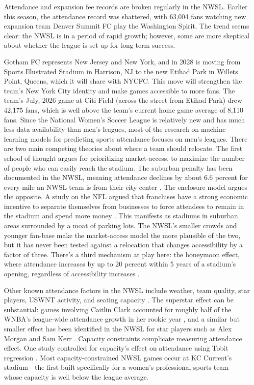 \documentclass[9pt,twoside]{pnas-new}
\begin{document}
Attendance and expansion fee records are broken regularly in the NWSL. Earlier this season, the attendance record was shattered, with 63,004 fans watching new expansion team Denver Summit FC play the Washington Spirit. The trend seems clear: the NWSL is in a period of rapid growth; however, some are more skeptical about whether the league is set up for long-term success.

Gotham FC represents New Jersey and New York, and in 2028 is moving from Sports Illustrated Stadium in Harrison, NJ to the new Etihad Park in Willets Point, Queens, which it will share with NYCFC. This move will strengthen the team's New York City identity and make games accessible to more fans. The team's July, 2026 game at Citi Field (across the street from Etihad Park) drew 42,175 fans, which is well above the team's current home game average of 8,110 fans. 
\Endparasplit Since the National Women's Soccer League is relatively new and has much less data availability than men's leagues, most of the research on machine learning models for predicting sports attendance focuses on men's leagues. There are two main competing theories about where a team should relocate. The first school of thought argues for prioritizing market-access, to maximize the number of people who can easily reach the stadium. The suburban penalty has been documented in the NWSL, meaning attendance declines by about 6.6 percent for every mile an NWSL team is from their city center \cite{DoesLocationMatterAnEconometricAnalysisofStadiumLocationandAttendanceatNationalWomensSoccerLeagueMatches}. The enclosure model argues the opposite. A study on the NFL argued that franchises have a strong economic incentive to separate themselves from businesses to force attendees to remain in the stadium and spend more money \cite{mls}. This manifests as stadiums in suburban areas surrounded by a moat of parking lots. The NWSL's smaller crowds and younger fan-base make the market-access model the more plausible of the two, but it has never been tested against a relocation that changes accessibility by a factor of three. There's a third mechanism at play here: the honeymoon effect, where attendance increases by up to 20 percent within 5 years of a stadium's opening, regardless of accessibility increases \cite{article}. 

Other known attendance factors in the NWSL include weather, team quality, star players, USWNT activity, and seating capacity \cite{doi:10.1177/15270025231217973}. The superstar effect can be substantial: games involving Caitlin Clark accounted for roughly half of the WNBA's league-wide attendance growth in her rookie year \cite{clarkonomics}, and a similar but smaller effect has been identified in the NWSL for star players such as Alex Morgan and Sam Kerr \cite{doi:10.1177/15270025231217973}. Capacity constraints complicate measuring attendance effect. One study controlled for capacity's effect on attendance using Tobit regression \cite{DoesLocationMatterAnEconometricAnalysisofStadiumLocationandAttendanceatNationalWomensSoccerLeagueMatches}. Most capacity-constrained NWSL games occur at KC Current's stadium—the first built specifically for a women's professional sports team—whose capacity is well below the league average.
\end{document}
